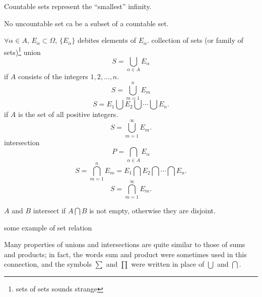 Countable sets represent the ``smallest'' infinity.

No uncountable set ca be a subset of a countable set.


\begin{myDef}\label{myDef:2.9 union_intersection}
    $\forall \alpha\in A$, $E_\alpha \subset \Omega$, $\{E_\alpha\}$ debites elements of $E_\alpha$. collection of sets (or family of sets)\footnote{sets of sets sounds strange}    
    union
    \begin{equation}\label{eq:2.1 union}
        S = \bigcup_{\alpha\in A} E_\alpha
    \end{equation}
    if $A$ consists of the integers $1,2,...,n$.
    \begin{equation}\label{eq:2.2 union finite}
        S = \bigcup_{m=1}^n E_m
    \end{equation}
    \begin{equation}\label{eq:2.3 union finite2}
        S = E_1 \bigcup E_2 \bigcup \cdots \bigcup E_n.
    \end{equation}
    if $A$ is the set of all positive integers.
    \begin{equation}\label{eq:2.4 union countable}
        S = \bigcup_{m=1}^{\infty} E_m.
    \end{equation}
    intersection
    \begin{equation}\label{eq:2.5 intersection}
        P = \bigcap_{\alpha\in A} E_\alpha
    \end{equation}
    \begin{equation}\label{eq:2.6 intersection finite}
        S = \bigcap_{m=1}^n E_m = E_1 \bigcap E_2 \bigcap \cdots \bigcap E_n.
    \end{equation}
    \begin{equation}\label{eq:2.7 intersection countable}
        S = \bigcap_{m=1}^{\infty} E_m.
    \end{equation}

    $A$ and $B$ intersect if $A\bigcap B$ is not empty, otherwise they are disjoint.
\end{myDef}

\begin{myExample}
    some example of set relation
\end{myExample}

\begin{myRemark}
    Many properties of unions and intersections are quite similar to those of sums and products; in fact, the words sum and product were sometimes used in this connection, and the symbols $\sum$ and $\prod$ were written in place of $\bigcup$ and $\bigcap$.
\end{myRemark}


